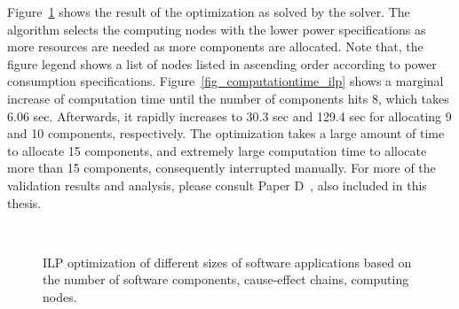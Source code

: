Figure~\ref{fig_ilp_results} shows the result of the \ilp{} optimization as solved by the \cplex{} solver. The algorithm selects the computing nodes with the lower power specifications as more resources are needed as more components are allocated. Note that, the figure legend shows a list of nodes listed in ascending order according to power consumption specifications. Figure~\ref{fig_computationtime_ilp} shows a marginal increase of computation time until the number of components hits 8, which takes 6.06 sec. Afterwards, it rapidly increases to 30.3 sec and 129.4 sec for allocating 9 and 10 components, respectively. The optimization takes a large amount of time to allocate 15 components, and extremely large computation time to allocate more than 15 components, consequently interrupted manually. For more of the validation results and analysis, please consult Paper D~\cite{Mahmud5222}, also included in this thesis.
\begin{figure}[h] 
	\centering
	 ~
	\caption{ILP optimization of different sizes of software applications based on the number of software components, cause-effect chains, computing nodes.} \label{fig_ilp_results}
\end{figure}

